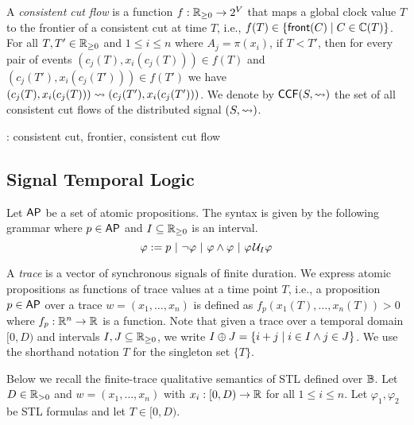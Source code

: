 A \emph{consistent cut flow} is a function $f : \mathbb{R}_{\geq 0} \to 2^V$ that maps a global clock value $T$ to the frontier of a consistent cut at time $T$, i.e., $f(T) \in \{\fr(C) \st C \in \CC(T)\}$.
For all $T,T' \in \mathbb{R}_{\geq 0}$ and $1 \leq i \leq n$ where $A_j = \pi(x_i)$, if $T < T'$, then for every pair of events $(c_j(T), x_i(c_j(T))) \in f(T)$ and $(c_j(T'), x_i(c_j(T'))) \in f(T')$ we have $(c_j(T), x_i(c_j(T))) \rightsquigarrow (c_j(T'), x_i(c_j(T')))$.
We denote by $\mathsf{CCF}(S,{\rightsquigarrow})$ the set of all consistent cut flows of the distributed signal $(S,{\rightsquigarrow})$.

\begin{example}
	\TODO: consistent cut, frontier, consistent cut flow
\end{example}


\subsection{Signal Temporal Logic} \label{sec:stl}
Let $\mathsf{AP}$ be a set of atomic propositions.
The syntax is given by the following grammar where $p \in \mathsf{AP}$ and $I \subseteq \mathbb{R}_{\geq 0}$ is an interval.
$$ \varphi :=  p ~|~ \lnot \varphi ~|~ \varphi \land \varphi ~|~ \varphi \kern.1em\mathcal{U}_I \varphi$$

A \emph{trace} is a vector of synchronous signals of finite duration.
We express atomic propositions as functions of trace values at a time point $T$, i.e., a proposition $p \in \mathsf{AP}$ over a trace $w = (x_1, \ldots, x_n)$ is defined as $f_p(x_1(T), \ldots, x_n(T)) > 0$ where $f_p : \mathbb{R}^n \to \mathbb{R}$ is a function. 
Note that given a trace over a temporal domain $[0,D)$ and intervals $I,J \subseteq \mathbb{R}_{\geq 0}$, we write $I \oplus J = \{i + j \st i \in I \land j \in J\}$.
We use the shorthand notation $T$ for the singleton set $\{T\}$. 

Below we recall the finite-trace qualitative semantics of STL defined over $\mathbb{B}$.
Let $D \in \mathbb{R}_{> 0}$ and $w = (x_1, \ldots, x_n)$ with $x_i : [0,D) \to \mathbb{R}$ for all $1 \leq i \leq n$.
Let $\varphi_1, \varphi_2$ be STL formulas and let $T \in [0,D)$.

